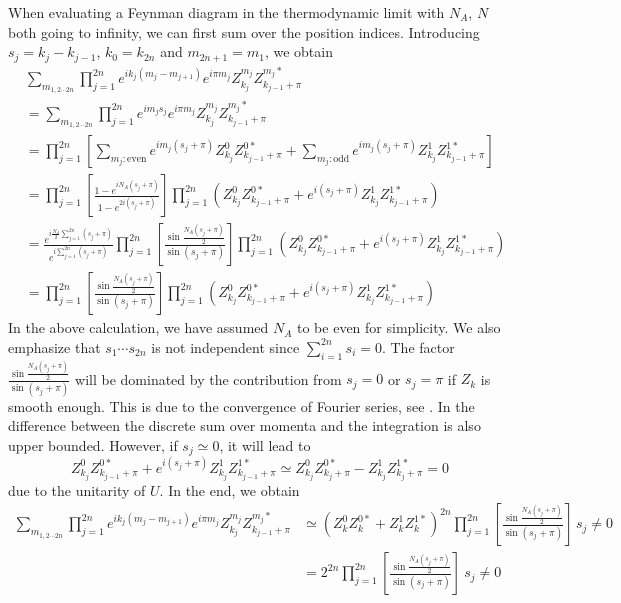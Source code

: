 When evaluating a Feynman diagram in the thermodynamic limit with %
$N_{A}$, $N$ both going to infinity,
we can first sum over the position indices. Introducing $s_{j}=k_{j}-k_{j-1}$, $k_{0}=k_{2n}$
and $m_{2n+1}=m_{1}$, we obtain
\begin{align*}
 & \sum_{m_{1,2\cdots2n}}\prod_{j=1}^{2n}e^{ik_{j}(m_{j}-m_{j+1})}e^{i\pi m_{j}}Z_{k_{j}}^{m_{j}}Z_{k_{j-1}+\pi}^{m_{j}*}\\
 & =\sum_{m_{1,2\cdots2n}}\prod_{j=1}^{2n}e^{im_{j}s_{j}}e^{i\pi m_{j}}Z_{k_{j}}^{m_{j}}Z_{k_{j-1}+\pi}^{m_{j}*}\\
 & =\prod_{j=1}^{2n}\left[\sum_{m_{j}:\mathrm{even}}e^{im_{j}(s_{j}+\pi)}Z_{k_{j}}^{0}Z_{k_{j-1}+\pi}^{0*}+\sum_{m_{j}:\mathrm{odd}}e^{im_{j}(s_{j}+\pi)}Z_{k_{j}}^{1}Z_{k_{j-1}+\pi}^{1*}\right]\\
 & =\prod_{j=1}^{2n}\left[\frac{1-e^{iN_{A}(s_{j}+\pi)}}{1-e^{2i(s_{j}+\pi)}}\right]\prod_{j=1}^{2n}(Z_{k_{j}}^{0}Z_{k_{j-1}+\pi}^{0*}+e^{i(s_{j}+\pi)}Z_{k_{j}}^{1}Z_{k_{j-1}+\pi}^{1*})\\
 & =\frac{e^{i\frac{N_{A}}{2}\sum_{j=1}^{2n}(s_{j}+\pi)}}{e^{i\sum_{j=1}^{2n}(s_{j}+\pi)}}\prod_{j=1}^{2n}\left[\frac{\sin\frac{N_{A}(s_{j}+\pi)}{2}}{\sin(s_{j}+\pi)}\right]\prod_{j=1}^{2n}(Z_{k_{j}}^{0}Z_{k_{j-1}+\pi}^{0*}+e^{i(s_{j}+\pi)}Z_{k_{j}}^{1}Z_{k_{j-1}+\pi}^{1*})\\
 & =\prod_{j=1}^{2n}\left[\frac{\sin\frac{N_{A}(s_{j}+\pi)}{2}}{\sin(s_{j}+\pi)}\right]\prod_{j=1}^{2n}(Z_{k_{j}}^{0}Z_{k_{j-1}+\pi}^{0*}+e^{i(s_{j}+\pi)}Z_{k_{j}}^{1}Z_{k_{j-1}+\pi}^{1*})
\end{align*}
In the above calculation, we have assumed $N_{A}$ to be even for simplicity. We also emphasize that $s_{1}\cdots s_{2n}$ is not independent since $\sum_{i=1}^{2n}s_{i}=0$.
The factor $\frac{\sin\frac{N_{A}(s_{j}+\pi)}{2}}{\sin(s_{j}+\pi)}$
will be dominated by the contribution from $s_{j}=0$ or $s_{j}=\pi$
if $Z_{k}$ is smooth enough. This is due to the convergence of Fourier
series, see \citep{stein2003fourier}. In \citep{Kress1998}
the difference between the discrete sum over momenta and the integration is also upper bounded. However, if $s_{j}\simeq%
0$, it will lead to 
\begin{equation}
Z_{k_{j}}^{0}Z_{k_{j-1}+\pi}^{0*}+e^{i(s_{j}+\pi)}Z_{k_{j}}^{1}Z_{k_{j-1}+\pi}^{1*}\simeq%
Z_{k_{j}}^{0}Z_{k_{j}+\pi}^{0*}-Z_{k_{j}}^{1}Z_{k_{j}+\pi}^{1*}=0
\end{equation}
due to the unitarity of $U$. In the end, %
we obtain 
\begin{align}
\sum_{m_{1,2\cdots2n}}\prod_{j=1}^{2n}e^{ik_{j}(m_{j}-m_{j+1})}e^{i\pi m_{j}}Z_{k_{j}}^{m_{j}}Z_{k_{j-1}+\pi}^{m_{j}*} & \simeq(Z_{k}^{0}Z_{k}^{0*}+Z_{k}^{1}Z_{k}^{1*})^{2n}\prod_{j=1}^{2n}\left[\frac{\sin\frac{N_{A}(s_{j}+\pi)}{2}}{\sin(s_{j}+\pi)}\right]\,s_{j}\neq 0\nonumber \\
 & =2^{2n}\prod_{j=1}^{2n}\left[\frac{\sin\frac{N_{A}(s_{j}+\pi)}{2}}{\sin(s_{j}+\pi)}\right]\ s_{j}\neq 0
 \label{eq:Summing_Over_position}
\end{align}
